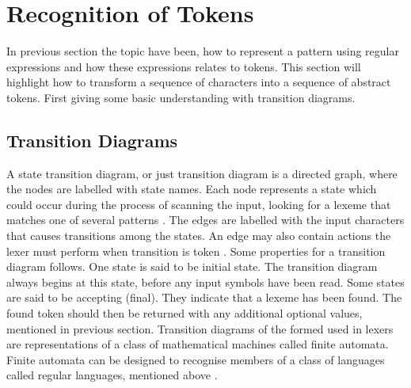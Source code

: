 \section{Recognition of Tokens}
In previous section the topic have been, how to represent a pattern using 
regular expressions and how these expressions relates to tokens. This section 
will highlight how to transform a sequence of characters into a sequence of 
abstract tokens. First giving some basic understanding with transition diagrams.  
\subsection{Transition Diagrams}
A state transition diagram, or just transition diagram is a directed graph,
where the nodes are labelled with state names. Each node 
represents a state which could occur during the process of scanning the input, 
looking for a lexeme that matches one of several patterns \cite{Aho2006}. The 
edges are labelled with the input characters that causes transitions among 
the states. An edge may also contain actions the lexer must perform when 
transition is token \cite{sebesta2012}. Some properties for a 
transition diagram follows. One state is said to be initial state. The transition 
diagram always begins at this state, before any input symbols have been read. 
Some states are said to be accepting (final). They indicate that a lexeme has 
been found. The found token should then be returned with any additional 
optional values, mentioned in previous section.\cite{Aho2006}
Transition diagrams of the formed used in lexers are representations of a class 
of mathematical machines called finite automata. Finite automata can be 
designed to recognise members of a class of languages called regular languages, 
mentioned above \cite{sebesta2012}.
